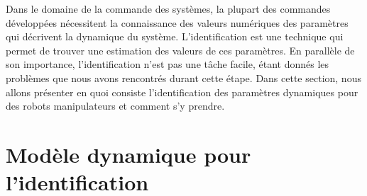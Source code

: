 \documentclass[12pt,a4paper,twoside]{report}
\begin{document}
Dans le domaine de la commande des systèmes, la plupart des commandes développées nécessitent la connaissance des valeurs numériques des paramètres qui décrivent la dynamique du système.
L'identification est une technique qui permet de trouver une estimation des valeurs de ces paramètres. En parallèle de son importance, l'identification n'est pas une tâche facile, étant donnés les problèmes que nous avons rencontrés durant cette étape. Dans cette section, nous allons présenter en quoi consiste l'identification des paramètres dynamiques pour des robots manipulateurs et comment s'y prendre.

\section{Modèle dynamique pour l'identification}
\label{Ident_denso}
\end{document}
